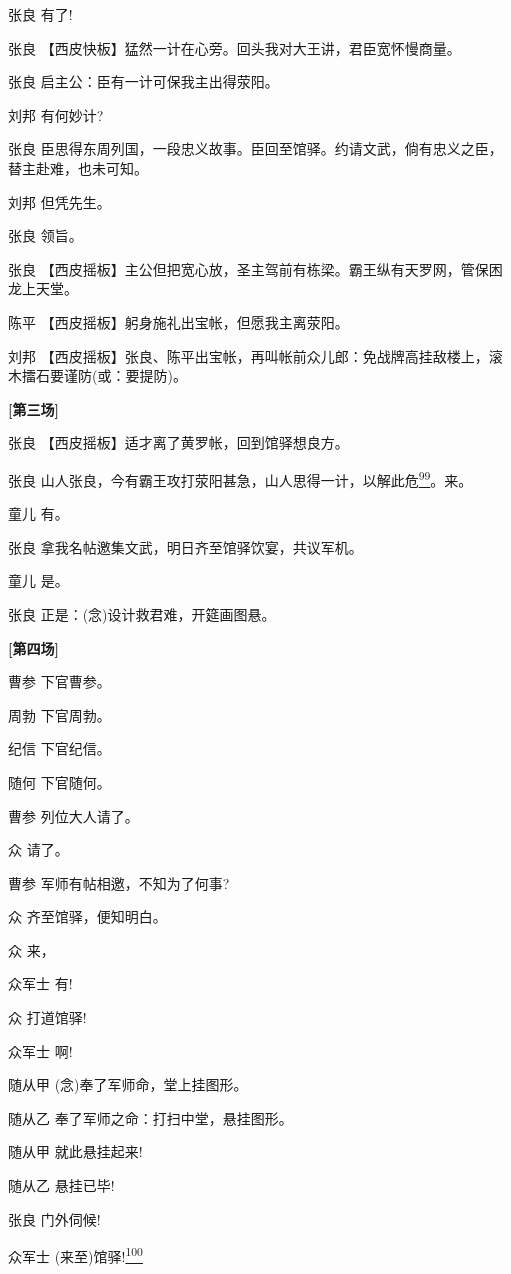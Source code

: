 张良 有了!

张良 【西皮快板】猛然一计在心旁。回头我对大王讲，君臣宽怀慢商量。

张良 启主公：臣有一计可保我主出得荥阳。

刘邦 有何妙计?

张良
臣思得东周列国，一段忠义故事。臣回至馆驿。约请文武，倘有忠义之臣，替主赴难，也未可知。

刘邦 但凭先生。

张良 领旨。

张良
【西皮摇板】主公但把宽心放，圣主驾前有栋梁。霸王纵有天罗网，管保困龙上天堂。

陈平 【西皮摇板】躬身施礼出宝帐，但愿我主离荥阳。

刘邦
【西皮摇板】张良、陈平出宝帐，再叫帐前众儿郎：免战牌高挂敌楼上，滚木擂石要谨防(或：要提防)。

\textbf{{[}第三场{]}}

张良 【西皮摇板】适才离了黄罗帐，回到馆驿想良方。

张良
山人张良，今有霸王攻打荥阳甚急，山人思得一计，以解此危\protect\hyperlink{fn99}{\textsuperscript{99}}。来。

童儿 有。

张良 拿我名帖邀集文武，明日齐至馆驿饮宴，共议军机。

童儿 是。

张良 正是：(念)设计救君难，开筵画图悬。

\textbf{{[}第四场{]}}

曹参 下官曹参。

周勃 下官周勃。

纪信 下官纪信。

随何 下官随何。

曹参 列位大人请了。

众 请了。

曹参 军师有帖相邀，不知为了何事?

众 齐至馆驿，便知明白。

众 来，

众军士 有!

众 打道馆驿!

众军士 啊!

随从甲 (念)奉了军师命，堂上挂图形。

随从乙 奉了军师之命：打扫中堂，悬挂图形。

随从甲 就此悬挂起来!

随从乙 悬挂已毕!

张良 门外伺候!

众军士 (来至)馆驿!\protect\hyperlink{fn100}{\textsuperscript{100}}

